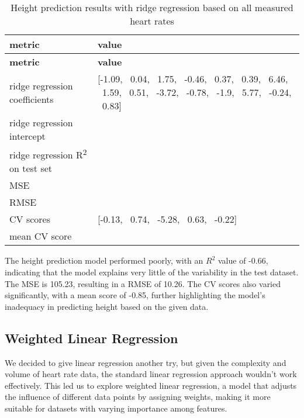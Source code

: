 \begin{table}[H]
\begin{longtable}{|>{\raggedright}p{4cm}|>{\raggedright\arraybackslash}p{10cm}|}
\hline
\textbf{metric} & \textbf{value} \\
\hline
\endfirsthead
\hline
\textbf{metric} & \textbf{value} \\
\hline
\endhead
\hline
\endfoot
ridge regression coefficients & 
\begin{minipage}[t]{10cm}
[-1.09, \  0.04, \  1.75, \ -0.46, \  0.37, \  0.39, \  6.46, \  1.59, \  0.51, \ -3.72, \ -0.78, \ -1.9, \  5.77, \ -0.24, \  0.83]
\end{minipage}
\\
\hline
ridge regression intercept & 173.83 \\
\hline
ridge regression R\textsuperscript{2} on test set & -0.66\\
\hline
MSE & 105.23 \\
\hline
RMSE & 10.26 \\
\hline
CV scores & 
\begin{minipage}[t]{10cm}
[-0.13, \  0.74, \ -5.28, \  0.63, \ -0.22]
\end{minipage}
\\
\hline
mean CV score & -0.85 \\
\hline
\end{longtable}
\caption{Height prediction results with ridge regression based on all measured heart rates}
\label{tab:RRHeightallheart}
\end{table}

The height prediction model performed poorly, with an \( R^2 \) value of -0.66, indicating that the model explains very little of the variability in the test dataset. The MSE is 105.23, resulting in a RMSE of 10.26. The CV scores also varied significantly, with a mean score of -0.85, further highlighting the model's inadequacy in predicting height based on the given data.

\subsection{Weighted Linear Regression}

We decided to give linear regression another try, but given the complexity and volume of heart rate data, the standard linear regression approach wouldn't work effectively. This led us to explore weighted linear regression, a model that adjusts the influence of different data points by assigning weights, making it more suitable for datasets with varying importance among features.

